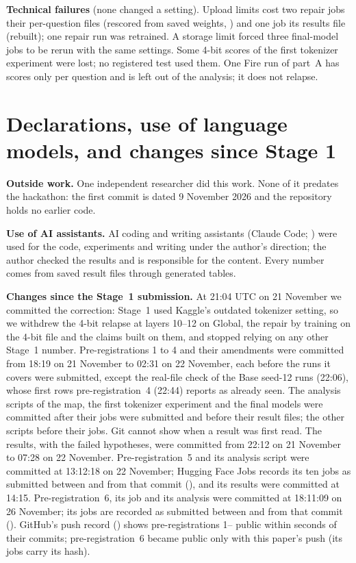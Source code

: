 \textbf{Technical failures} (none changed a setting). Upload limits cost two repair jobs their per-question files (rescored from saved weights, ) and one job its results file (rebuilt); one repair run was retrained. A storage limit forced three final-model jobs to be rerun with the same settings. Some 4-bit scores of the first tokenizer experiment were lost; no registered test used them. One Fire run of part~A has \nf{} scores only per question and is left out of the analysis; it does not relapse.

\section{Declarations, use of language models, and changes since Stage 1}
\label{app:decl}

\textbf{Outside work.} One independent researcher did this work. None of it predates the hackathon: the first commit is dated 9 November 2026 and the repository holds no earlier code.

\textbf{Use of AI assistants.} AI coding and writing assistants (Claude Code; \citealp{claudecode}) were used for the code, experiments and writing under the author's direction; the author checked the results and is responsible for the content. Every number comes from saved result files through generated tables.

\textbf{Changes since the Stage~1 submission.} At 21:04 UTC on 21 November we committed the correction: Stage~1 used Kaggle's outdated tokenizer setting, so we withdrew the 4-bit relapse at layers 10--12 on Global, the repair by training on the 4-bit file and the claims built on them, and stopped relying on any other Stage~1 number. Pre-registrations 1 to 4 and their amendments were committed from 18:19 on 21 November to 02:31 on 22 November, each before the runs it covers were submitted, except the real-file check of the Base seed-12 runs (22:06), whose first rows pre-registration~4 (22:44) reports as already seen. The analysis scripts of the map, the first tokenizer experiment and the final models were committed after their jobs were submitted and before their result files; the other scripts before their jobs. Git cannot show when a result was first read. The results, with the failed hypotheses, were committed from 22:12 on 21 November to 07:28 on 22 November. Pre-registration~5 and its analysis script were committed at 13:12:18 on 22 November; Hugging Face Jobs records its ten jobs as submitted between \revPrFiveFirst{} and \revPrFiveLast{} from that commit (\texttt{\revPrFiveCommit}), and its results were committed at 14:15. Pre-registration~6, its job and its analysis were committed at 18:11:09 on 26 November; its \revPrSixJobs{} jobs are recorded as submitted between \revPrSixFirst{} and \revPrSixLast{} from that commit (\texttt{\revPrSixCommit}). GitHub's push record () shows pre-registrations 1--\pushPublic{} public within \pushMaxLag{} seconds of their commits; pre-registration~6 became public only with this paper's push (its jobs carry its hash).
